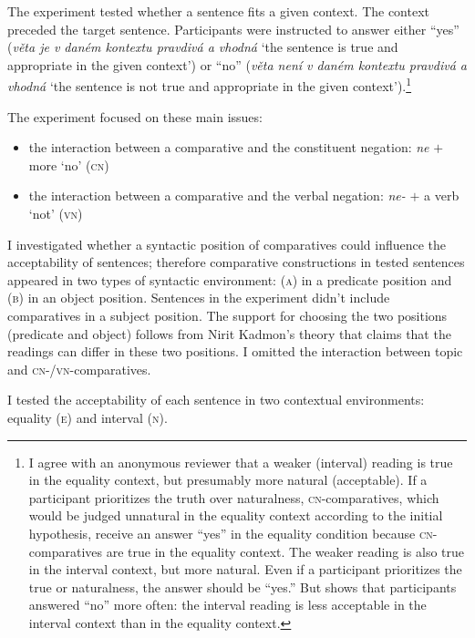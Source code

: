 \documentclass[output=paper,
]{langscibook}
\begin{document}
The experiment tested whether a sentence fits a given context. The context preceded the target sentence. Participants were instructed to answer either ``yes'' (\textit{věta je v daném kontextu pravdivá a vhodná} `the sentence is true and appropriate in the given context') or ``no'' (\textit{věta není v daném kontextu pravdivá a vhodná} `the sentence is not true and appropriate in the given context').\footnote{I agree with an anonymous reviewer that a weaker (interval) reading is true in the equality context, but presumably more natural (acceptable). If a participant prioritizes the truth over naturalness, \textsc{cn}-comparatives, which would be judged unnatural in the equality context according to the initial hypothesis, receive an answer ``yes'' in the equality condition because  \textsc{cn-}comparatives are true in the equality context. The weaker reading is also true in the interval context, but more natural. Even if a participant prioritizes the true or naturalness, the answer should be ``yes.'' But  shows that participants answered ``no'' more often: the interval reading is less acceptable in the interval context than in the equality context.}

The experiment focused on these main issues:

\begin{itemize}
\item the interaction between a comparative and the constituent negation: \textit{ne} $+$ more `no' (\textsc{cn})
\item the interaction between a comparative and the verbal negation: \textit{ne-} $+$ a verb `not' (\textsc{vn}) 
\end{itemize}

\noindent I investigated whether a syntactic position of comparatives could influence the acceptability of sentences; therefore comparative constructions in tested sentences appeared in two types of syntactic environment: (\textsc{a}) in a predicate position and (\textsc{b}) in an object position. Sentences in the experiment didn't include comparatives in a subject position. The support for choosing the two positions (predicate and object) follows from Nirit Kadmon's theory \citep{kadmon2001formal} that claims that the readings can differ in these two positions. I omitted the interaction between topic and \textsc{cn-/vn-}comparatives.

I tested the acceptability of each sentence in two contextual environments:  equality (\textsc{e}) and interval (\textsc{n}). 
\end{document}
